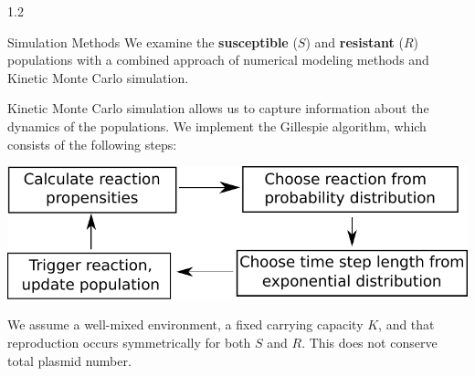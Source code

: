 \documentclass[final]{beamer}
\newlength{\sepwid}
\newlength{\onecolwid}
\newlength{\figwid}
\begin{document}
\begin{frame}[t]
\begin{block}
\begin{columns}[t]
\begin{column}{1.2\onecolwid}
  \begin{alertblock}{Simulation Methods}
    We examine the \textbf{susceptible} ($S$) and \textbf{resistant} ($R$) populations
    with a combined approach of numerical modeling methods and Kinetic Monte
    Carlo simulation.

    \quad\quad Kinetic Monte Carlo simulation allows us to
    capture information about the dynamics of the populations. We implement the
    Gillespie algorithm, which consists of the following steps:
    \begin{center}
    \includegraphics[width=\figwid]{../dev/graphics/poster/gillespie.pdf}
    \end{center}

    \quad\quad We assume a well-mixed environment, a fixed carrying capacity $K$, and
    that reproduction occurs symmetrically for both $S$ and $R$. This does not conserve total
    plasmid number.

    \vspace{1ex}
  \end{alertblock}
\end{column}
\end{columns} %
\end{block}



\end{frame}
\end{document}
